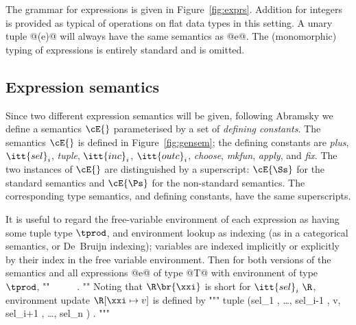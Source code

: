 \documentclass[11pt]{article}
\begin{document}
The grammar for expressions is given in Figure~\ref{fig:exprs}.
Addition for integers is provided as typical of operations on flat data
types in this setting.  A unary tuple @(e)@ will always have the same
semantics as @e@.  The (monomorphic) typing of expressions is entirely
standard and is omitted.

\subsection{Expression semantics}
Since two different expression semantics will be given, following
Abramsky \cite{Abr90} we define a semantics $\cE{}$ parameterised by a
set of {\it defining constants}.  The semantics $\cE{}$ is defined in
Figure~\ref{fig:gensem}; the defining constants are {\it plus},
$\itt{sel}_i$, {\it tuple}, $\itt{inc}_i$, $\itt{outc}_i$, {\it
choose}, {\it mkfun}, {\it apply}, and {\it fix}.  The two instances
of $\cE{}$ are distinguished by a superscript: $\cE{\Ss}$ for the
standard semantics and $\cE{\Ps}$ for the non-standard semantics.  The
corresponding type semantics, and defining constants, have the same 
superscripts.

It is useful to regard the free-variable environment of each
expression as having some tuple type $\tprod$, and environment lookup
as indexing (as in a categorical semantics, or De~Bruijn indexing);
variables are indexed implicitly or explicitly by their index in the
free variable environment.  Then for both versions of the semantics
and all expressions @e@ of type @T@ with environment of type $\tprod$,
""
	\ \in\ \Te{}{\tprod}~\fto~\ .
""
Noting that $\R\br{\xxi}$ is short for $\itt{sel}_i~\R$, environment
update $\R[\xxi\mapsto{}v]$ is defined by
"""
	tuple (sel_1 \R, \ldots, sel_{i-1} \R, v, sel_{i+1} \R, \ldots, sel_n \R) .
"""
\end{document}
